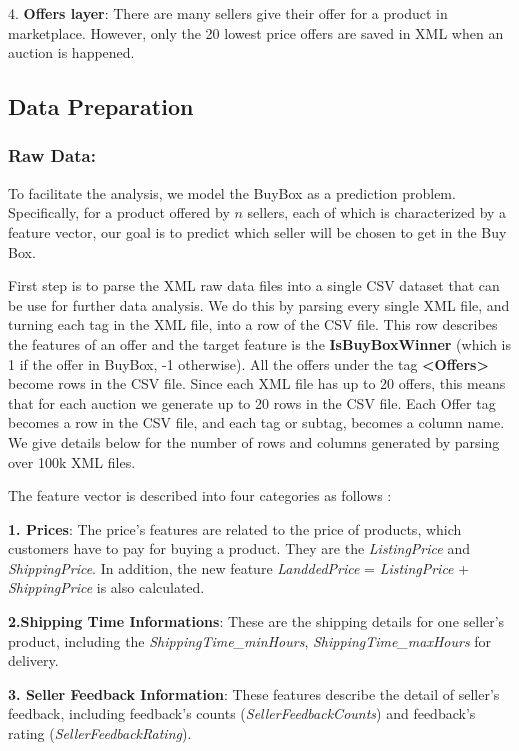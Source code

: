 4. \textbf{Offers layer}: There are many sellers give their offer for a product in marketplace. However, only the 20 lowest price offers are saved in XML when an auction is happened.

\subsection{Data Preparation}
\label{sec:dataprepare}

\subsubsection{Raw Data:}
\label{sec:datacsv}
To facilitate the analysis, we model the BuyBox as a prediction problem. Specifically, for a product offered by $n$ sellers, each of which is characterized by a feature vector, our goal is to predict which seller will be chosen to get in the Buy Box. 

First step is to parse the XML raw data files into a single CSV dataset that can be use for further data analysis. We do this by parsing every single XML file, and turning each tag in the XML file, into a row of the CSV file. This row describes the features of an offer and the target feature is the \textbf{IsBuyBoxWinner} (which is 1 if the offer in BuyBox, -1 otherwise). All the offers under the tag \textbf{<Offers>} become rows in the CSV file. Since each XML file has up to 20 offers, this means that for each auction we generate up to 20 rows in the CSV file. Each Offer tag becomes a row in the CSV file, and each tag or subtag, becomes a column name. We give details below for the number of rows and columns generated by parsing over 100k XML files.

The feature vector is described into four categories as follows :

\textbf{1. Prices}: The price's features are related to the price of products, which customers have to pay for buying a product. They are the \textit{ListingPrice} and \textit{ShippingPrice}. In addition, the new feature \textit{LanddedPrice} = \textit{ListingPrice} + \textit{ShippingPrice} is also calculated.

\textbf{2.Shipping Time Informations}: These are the shipping details for one seller's product, including the \textit{ShippingTime\_minHours}, \textit{ShippingTime\_maxHours} for delivery. 

\textbf{3. Seller Feedback Information}: These features describe the detail of seller's feedback, including feedback's counts (\textit{SellerFeedbackCounts}) and feedback's rating (\textit{SellerFeedbackRating}). 

